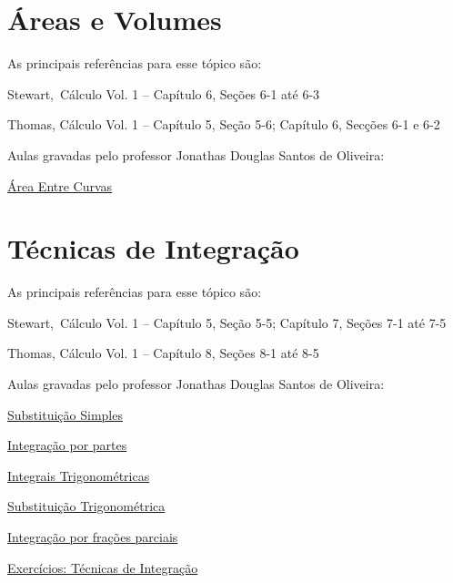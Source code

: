 \section{Áreas e Volumes}

As principais referências para esse tópico são:
\begin{listrefs}
  \item Stewart,\, Cálculo Vol. 1 \cite{stewart_1} -- Capítulo 6, Seções 6-1 até 6-3
  \item Thomas,    Cálculo Vol. 1 \cite{thomas_1}  -- Capítulo 5, Seção 5-6; Capítulo 6, Secções 6-1 e 6-2
\end{listrefs}

Aulas gravadas pelo professor Jonathas Douglas Santos de Oliveira:
\begin{listlinks}
  \item \href{https://youtu.be/LL2d3vOB31s}{Área Entre Curvas}
\end{listlinks}

\section{Técnicas de Integração}

As principais referências para esse tópico são:
\begin{listrefs}
  \item Stewart,\, Cálculo Vol. 1 \cite{stewart_1} -- Capítulo 5, Seção 5-5; Capítulo 7, Seções 7-1 até 7-5
  \item Thomas,    Cálculo Vol. 1 \cite{thomas_1}  -- Capítulo 8, Seções 8-1 até 8-5
\end{listrefs}

Aulas gravadas pelo professor Jonathas Douglas Santos de Oliveira:
\begin{listlinks}
  \item \href{https://youtu.be/aqnCC7TkHhI}{Substituição Simples}
  \item \href{https://youtu.be/a\_qvMOmJu0Q}{Integração por partes}
  \item \href{https://youtu.be/ijl8718-Xog}{Integrais Trigonométricas}
  \item \href{https://youtu.be/V-t\_HRuvw8Q}{Substituição Trigonométrica}
  \item \href{https://youtu.be/ztgPS7RVG7Y}{Integração por frações parciais}
  \item \href{https://youtu.be/iJG\_rojVgVs}{Exercícios: Técnicas de Integração}
\end{listlinks}


